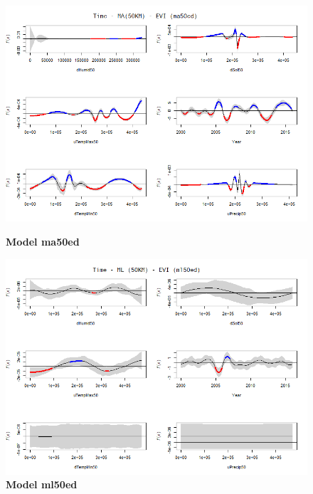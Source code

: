 \begin{figure}[H]
 \centering
    \begin{minipage}{0.8\textwidth}
        \centering
        \includegraphics[width=1.2\textwidth]{ma50ed.png} %
        \caption{\textbf{Model ma50ed}}
    \end{minipage}\hfill
    \begin{minipage}{0.8\textwidth}
        \centering
        \includegraphics[width=1.2\textwidth]{ml50ed.png} %
        \caption{\textbf{Model ml50ed}}
    \end{minipage}
\end{figure}

